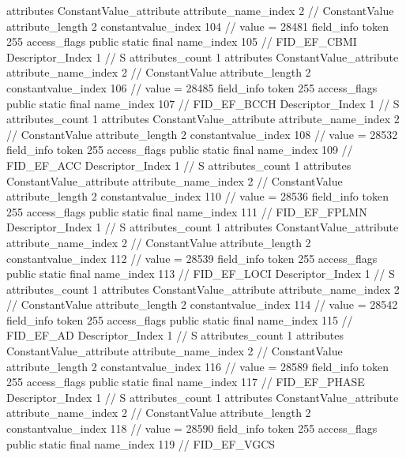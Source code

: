 {{{{{				attributes {
				ConstantValue_attribute {
					attribute_name_index	2		// ConstantValue
					attribute_length	2
					constantvalue_index	104		// value = 28481
				}
				}
			}
			field_info {
				token	255
				access_flags	public static final
				name_index	105		// FID_EF_CBMI
				Descriptor_Index	1		// S
				attributes_count	1
				attributes {
				ConstantValue_attribute {
					attribute_name_index	2		// ConstantValue
					attribute_length	2
					constantvalue_index	106		// value = 28485
				}
				}
			}
			field_info {
				token	255
				access_flags	public static final
				name_index	107		// FID_EF_BCCH
				Descriptor_Index	1		// S
				attributes_count	1
				attributes {
				ConstantValue_attribute {
					attribute_name_index	2		// ConstantValue
					attribute_length	2
					constantvalue_index	108		// value = 28532
				}
				}
			}
			field_info {
				token	255
				access_flags	public static final
				name_index	109		// FID_EF_ACC
				Descriptor_Index	1		// S
				attributes_count	1
				attributes {
				ConstantValue_attribute {
					attribute_name_index	2		// ConstantValue
					attribute_length	2
					constantvalue_index	110		// value = 28536
				}
				}
			}
			field_info {
				token	255
				access_flags	public static final
				name_index	111		// FID_EF_FPLMN
				Descriptor_Index	1		// S
				attributes_count	1
				attributes {
				ConstantValue_attribute {
					attribute_name_index	2		// ConstantValue
					attribute_length	2
					constantvalue_index	112		// value = 28539
				}
				}
			}
			field_info {
				token	255
				access_flags	public static final
				name_index	113		// FID_EF_LOCI
				Descriptor_Index	1		// S
				attributes_count	1
				attributes {
				ConstantValue_attribute {
					attribute_name_index	2		// ConstantValue
					attribute_length	2
					constantvalue_index	114		// value = 28542
				}
				}
			}
			field_info {
				token	255
				access_flags	public static final
				name_index	115		// FID_EF_AD
				Descriptor_Index	1		// S
				attributes_count	1
				attributes {
				ConstantValue_attribute {
					attribute_name_index	2		// ConstantValue
					attribute_length	2
					constantvalue_index	116		// value = 28589
				}
				}
			}
			field_info {
				token	255
				access_flags	public static final
				name_index	117		// FID_EF_PHASE
				Descriptor_Index	1		// S
				attributes_count	1
				attributes {
				ConstantValue_attribute {
					attribute_name_index	2		// ConstantValue
					attribute_length	2
					constantvalue_index	118		// value = 28590
				}
				}
			}
			field_info {
				token	255
				access_flags	public static final
				name_index	119		// FID_EF_VGCS
}}}}}
